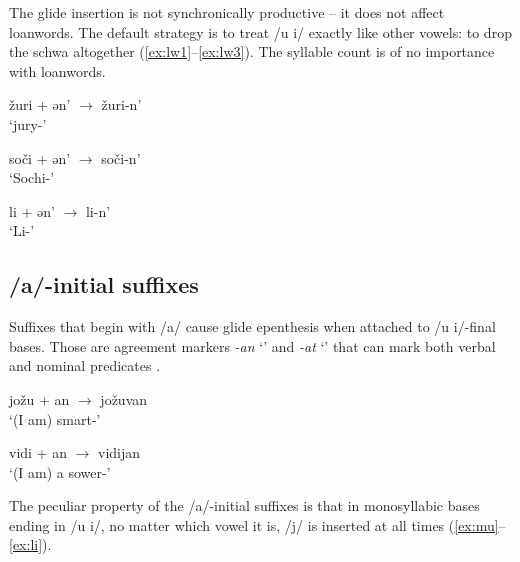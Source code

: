\documentclass[a4paper, 12pt]{article}
\begin{document}
	\noindent The glide insertion is not synchronically productive -- it does not affect loanwords. The default strategy is to treat /u i/ exactly like other vowels: to drop the schwa altogether (\ref{ex:lw1}--\ref{ex:lw3}). The syllable count is of no importance with loanwords. 
	
\begin{minipage}[t]{.3\linewidth}
\ex\label{ex:lw1}
	žuri + ən' $\rightarrow$ žuri-n' \\`jury-{\Gen}'
\xe
\end{minipage}
\hfill
\begin{minipage}[t]{.3\linewidth}
\ex\label{ex:lw2}
	soči + ən' $\rightarrow$ soči-n' \\ `Sochi-{\Gen}' 
\xe
\end{minipage}	
\hfill
\begin{minipage}[t]{.3\linewidth}
\ex\label{ex:lw3}
	li + ən' $\rightarrow$ li-n' \\ `Li-{\Gen}'
\xe
\end{minipage}
				
			\subsection{/a/-initial suffixes}
			
	Suffixes that begin with /a/ cause glide epenthesis when attached to /u i/-final bases. Those are agreement markers \emph{-an} `{\Fsg}' and \emph{-at} `{\Ssg}' that can mark both verbal and nominal predicates \parencite{kholodilova-np, toldova-clauses}.
	
\begin{minipage}[t]{.45\linewidth}
\ex\label{ex:jozu}
	jožu + an $\rightarrow$ jožuvan \\`(I am) smart-{\Fsg}' 
\xe
\end{minipage}
\hfill
\begin{minipage}[t]{.45\linewidth}
\ex\label{ex:vidi}
	vidi + an $\rightarrow$ vidijan \\`(I am) a sower-{\Fsg}' 
\xe
\end{minipage}	


	\noindent The peculiar property of the /a/-initial suffixes is that in monosyllabic bases ending in /u i/, no matter which vowel it is, /j/ is inserted at all times (\ref{ex:mu}--\ref{ex:li}).
	
\end{document}
